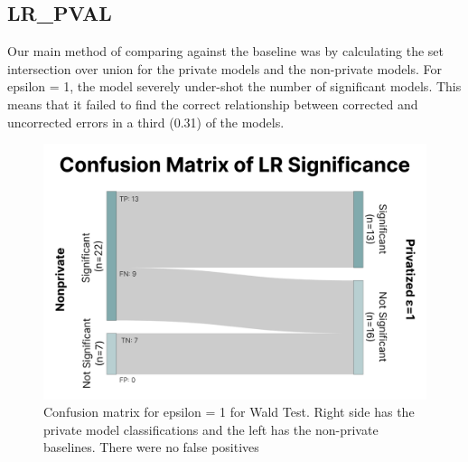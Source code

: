 \documentclass[12pt,letterpaper]{article}
\begin{document}
\subsection{LR\_PVAL}
Our main method of comparing against the baseline was by calculating the set intersection over union for the private models and the non-private models. For epsilon = 1, the model severely under-shot the number of significant models. This means that it failed to find the correct relationship between corrected and uncorrected errors in a third (0.31) of the models.

\begin{figure}[htbp]
\centering
\includegraphics[width=.85\linewidth]{figure/conf_matrix.png}
\caption{Confusion matrix for epsilon = 1 for Wald Test. Right side has the private model classifications and the left has the non-private baselines. There were no false positives}
\label{fig:conf_matrix}
\end{figure}
\end{document}
